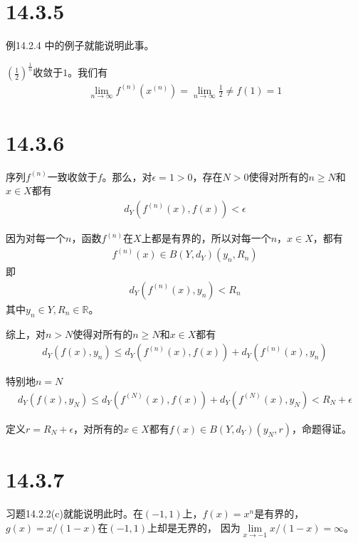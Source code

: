 \documentclass{article}
\begin{document}
\section*{14.3.5}

例14.2.4 中的例子就能说明此事。

$(\frac{1}{2})^{\frac{1}{n}}$收敛于$1$。我们有
\begin{align*}
  \lim\limits_{n \to \infty} f^{(n)}(x^{(n)}) = \lim\limits_{n \to \infty} \frac{1}{2} \neq f(1) = 1
\end{align*}

\section*{14.3.6}

序列$f^{(n)}$一致收敛于$f$。那么，对$\epsilon = 1 > 0$，存在$N > 0$使得对所有的$n \geq N$和$x \in X$都有
\begin{align*}
  d_Y(f^{(n)}(x), f(x)) < \epsilon
\end{align*}

因为对每一个$n$，函数$f^{(n)}$在$X$上都是有界的，所以对每一个$n$，$x \in X$，都有
\begin{align*}
  f^{(n)}(x) \in B(Y,d_Y) (y_n, R_n)
\end{align*}
即
\begin{align*}
  d_Y(f^{(n)}(x), y_n) < R_n
\end{align*}
其中$y_n \in Y, R_n \in \mathbb{R}$。

综上，对$n > N$使得对所有的$n \geq N$和$x \in X$都有
\begin{align*}
  d_Y(f(x), y_n) \leq d_Y(f^{(n)}(x), f(x)) + d_Y(f^{(n)}(x), y_n)
\end{align*}

特别地$n = N$
\begin{align*}
  d_Y(f(x), y_N) \leq d_Y(f^{(N)}(x), f(x)) + d_Y(f^{(N)}(x), y_N) < R_N + \epsilon
\end{align*}

定义$r = R_N + \epsilon$，对所有的$x \in X$都有$f(x) \in B(Y, d_Y) (y_N, r)$，命题得证。

\section*{14.3.7}

习题14.2.2(c)就能说明此时。在$(-1, 1)$上，$f(x) = x^n$是有界的，$g(x) = x/(1-x)$在$(-1, 1)$上却是无界的，
因为$\lim\limits_{x \to -1} x/(1-x) = \infty$。
\end{document}
